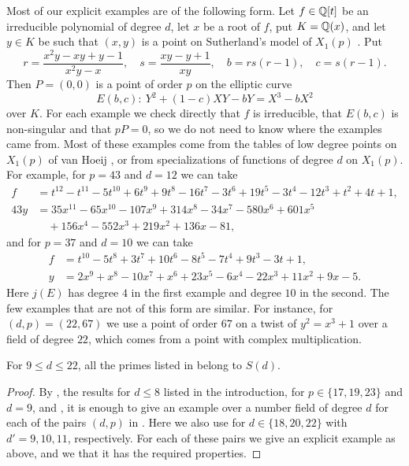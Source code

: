 Most of our explicit examples are of the following form. Let $f\in\mathbb{Q}[t]$ be an irreducible polynomial of degree $d$, let $x$ be a root of $f$, put $K=\mathbb{Q}(x)$, and let $y\in K$ be such that $(x,y)$ is a point on Sutherland's model of $X_1(p)$ \cite{sutherlandX1}. Put
$$r=\frac{x^2y-xy+y-1}{x^2y-x},\quad s=\frac{xy-y+1}{xy},\quad b=rs(r-1),\quad c=s(r-1).$$
Then $P=(0,0)$ is a point of order $p$ on the elliptic curve
$$E(b,c):\ Y^2+(1-c)XY-bY=X^3-bX^2$$
over $K$. For each example we check directly that $f$ is irreducible, that $E(b,c)$ is non-singular and that $pP=0$, so we do not need to know where the examples came from. Most of these examples come from the tables of low degree points on $X_1(p)$ of van Hoeij \cite{vanHoeij}, or from specializations of functions of degree $d$ on $X_1(p)$. For example, for $p=43$ and $d=12$ we can take
\begin{align*}
f&=t^{12}-t^{11}-5t^{10}+6t^9+9t^8-16t^7-3t^6+19t^5-3t^4-12t^3+t^2+4t+1,\\
43y&=35x^{11}-65x^{10}-107x^9+314x^8-34x^7-580x^6+601x^5\\
&\quad+156x^4-552x^3+219x^2+136x-81,
\end{align*}
and for $p=37$ and $d=10$ we can take
\begin{align*}
f&=t^{10}-5t^8+3t^7+10t^6-8t^5-7t^4+9t^3-3t+1,\\
y&=2x^9+x^8-10x^7+x^6+23x^5-6x^4-22x^3+11x^2+9x-5.
\end{align*}
Here $j(E)$ has degree $4$ in the first example and degree $10$ in the second. The few examples that are not of this form are similar. For instance, for $(d,p)=(22,67)$ we use a point of order $67$ on a twist of $y^2=x^3+1$ over a field of degree $22$, which comes from a point with complex multiplication.

\begin{proposition}\label{prop:lower}
For $9\leq d\leq 22$, all the primes listed in  belong to $S(d)$.
\end{proposition}

\begin{proof}
By , the results for $d\leq 8$ listed in the introduction, \cite[Theorem 1.1]{NV} for $p\in\{17,19,23\}$ and $d=9$, and , it is enough to give an example over a number field of degree $d$ for each of the pairs $(d,p)$ in . Here we also use  for $d\in\{18,20,22\}$ with $d'=9,10,11$, respectively. For each of these pairs we give an explicit example as above, and we  that it has the required properties.
\end{proof}

